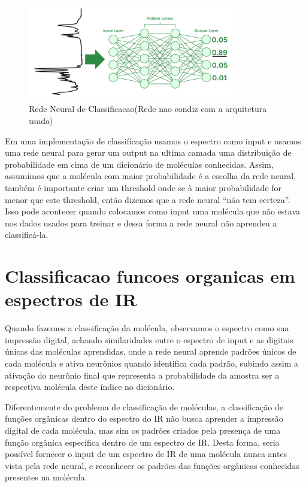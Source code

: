 \documentclass[11pt,a4paper]{article}
\begin{document}
\begin{figure}[h]
    \centering
    \includegraphics[width=0.8\textwidth]{Images/NN2.png}
    \caption{Rede Neural de Classificacao(Rede nao condiz com a arquitetura usada)}
    \label{fig:ir_spectrum}
\end{figure}

Em uma implementação de classificação usamos o espectro como input e usamos uma rede neural para gerar um output na ultima camada uma distribuição de probabilidade em cima de um dicionário de moléculas conhecidas. Assim, assumimos que a molécula com maior probabilidade é a escolha da rede neural, também é importante criar um threshold onde se à maior probabilidade for menor que este threshold, então dizemos que a rede neural “não tem certeza”. Isso pode acontecer quando colocamos como input uma molécula que não estava nos dados usados para treinar e dessa forma a rede neural não aprendeu a classificá-la.


\section{Classificacao funcoes organicas em espectros de IR}

Quando fazemos a classificação da molécula, observamos o espectro como sua impressão digital, achando similaridades entre o espectro de input e as digitais únicas das moléculas aprendidas, onde a rede neural aprende padrões únicos de cada molécula e ativa neurônios quando identifica cada padrão, subindo assim a ativação do neurônio final que representa a probabilidade da amostra ser a respectiva molécula deste índice no dicionário.

Diferentemente do problema de classificação de moléculas, a classificação de funções orgânicas dentro do espectro do IR não busca aprender a impressão digital de cada molécula, mas sim os padrões criados pela presença de uma função orgânica específica dentro de um espectro de IR. Desta forma, seria possível fornecer o input de um espectro de IR de uma molécula nunca antes vista pela rede neural, e reconhecer os padrões das funções orgânicas conhecidas presentes na molécula.
\end{document}
